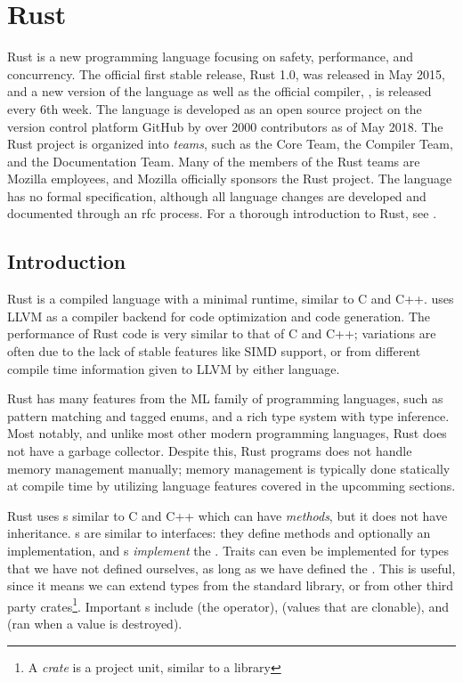 \chapter{Rust\label{ch:rust}}
\begin{epigraphs}
\end{epigraphs}

Rust \cite{rust} is a new programming language focusing on safety, performance, and concurrency.
The official first stable release, Rust 1.0, was released in May 2015, and a new version of the
language as well as the official compiler, , is released every 6th week. The language
is developed as an open source project on the version control platform GitHub\cite{github} by over
2000 contributors as of May 2018\cite{rust-github}. The Rust project is organized into
\emph{teams}, such as the Core Team, the Compiler Team, and the Documentation Team. Many of the
members of the Rust teams are Mozilla employees, and Mozilla officially sponsors the Rust project.
The language has no formal specification, although all language changes are developed and
documented through an \gls{rfc} process. For a thorough introduction to Rust, see \cite{trpl}.


\clearpage

\section{Introduction}

Rust is a compiled language with a minimal runtime, similar to C and C++.  uses
LLVM\cite{llvm} as a compiler backend for code optimization and code generation. The performance of
Rust code is very similar to that of C and C++\cite{rust-perf}; variations are often due to the
lack of stable features like SIMD support, or from different compile time information given to LLVM
by either language.

Rust has many features from the ML family of programming languages, such as pattern matching and
tagged enums, and a rich type system with type inference. Most notably, and unlike most other
modern programming languages, Rust does not have a garbage collector. Despite this, Rust programs
does not handle memory management manually; memory management is typically done statically at
compile time by utilizing language features covered in the upcomming sections.

Rust uses s similar to C and C++ which can have \emph{methods}, but it does not have
inheritance. s are similar to interfaces: they define methods and optionally an
implementation, and s \emph{implement} the . Traits can even be
implemented for types that we have not defined ourselves, as long as we have defined the
. This is useful, since it means we can extend types from the standard library, or from
other third party crates\footnote{A \emph{crate} is a project unit, similar to a library}.
Important s include  (the \code{*} operator),  (values that are
clonable), and  (ran when a value is destroyed).

